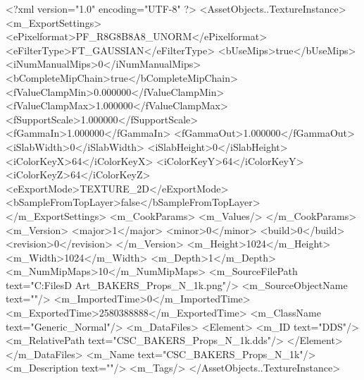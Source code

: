 <?xml version="1.0" encoding="UTF-8" ?>
<AssetObjects..TextureInstance>
	<m_ExportSettings>
		<ePixelformat>PF_R8G8B8A8_UNORM</ePixelformat>
		<eFilterType>FT_GAUSSIAN</eFilterType>
		<bUseMips>true</bUseMips>
		<iNumManualMips>0</iNumManualMips>
		<bCompleteMipChain>true</bCompleteMipChain>
		<fValueClampMin>0.000000</fValueClampMin>
		<fValueClampMax>1.000000</fValueClampMax>
		<fSupportScale>1.000000</fSupportScale>
		<fGammaIn>1.000000</fGammaIn>
		<fGammaOut>1.000000</fGammaOut>
		<iSlabWidth>0</iSlabWidth>
		<iSlabHeight>0</iSlabHeight>
		<iColorKeyX>64</iColorKeyX>
		<iColorKeyY>64</iColorKeyY>
		<iColorKeyZ>64</iColorKeyZ>
		<eExportMode>TEXTURE_2D</eExportMode>
		<bSampleFromTopLayer>false</bSampleFromTopLayer>
	</m_ExportSettings>
	<m_CookParams>
		<m_Values/>
	</m_CookParams>
	<m_Version>
		<major>1</major>
		<minor>0</minor>
		<build>0</build>
		<revision>0</revision>
	</m_Version>
	<m_Height>1024</m_Height>
	<m_Width>1024</m_Width>
	<m_Depth>1</m_Depth>
	<m_NumMipMaps>10</m_NumMipMaps>
	<m_SourceFilePath text="C:\Users\Shadow\Desktop\Working Files\3D Art\Textures\CSC_BAKERS_Props_N_1k.png"/>
	<m_SourceObjectName text=""/>
	<m_ImportedTime>0</m_ImportedTime>
	<m_ExportedTime>2580388888</m_ExportedTime>
	<m_ClassName text="Generic_Normal"/>
	<m_DataFiles>
		<Element>
			<m_ID text="DDS"/>
			<m_RelativePath text="CSC_BAKERS_Props_N_1k.dds"/>
		</Element>
	</m_DataFiles>
	<m_Name text="CSC_BAKERS_Props_N_1k"/>
	<m_Description text=""/>
	<m_Tags/>
</AssetObjects..TextureInstance>

